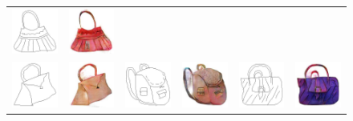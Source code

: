 \begin{figure}
\begin{center}
\begin{tabular}{cccccc}
\includegraphics[width=0.167\linewidth]{figs/handbags_sketches_lotsofresults_latex/input_13248.jpg} &
\includegraphics[width=0.167\linewidth]{figs/handbags_sketches_lotsofresults_latex/L1cGAN_13248.jpg} \\
\includegraphics[width=0.167\linewidth]{figs/handbags_sketches_lotsofresults_latex/input_13256.jpg} &
\includegraphics[width=0.167\linewidth]{figs/handbags_sketches_lotsofresults_latex/L1cGAN_13256.jpg} \hspace{0.025in} &

\includegraphics[width=0.167\linewidth]{figs/handbags_sketches_lotsofresults_latex/input_798.jpg} &
\includegraphics[width=0.167\linewidth]{figs/handbags_sketches_lotsofresults_latex/L1cGAN_798.jpg} \hspace{0.025in} &
\includegraphics[width=0.167\linewidth]{figs/handbags_sketches_lotsofresults_latex/input_13258.jpg} &
\includegraphics[width=0.167\linewidth]{figs/handbags_sketches_lotsofresults_latex/L1cGAN_13258.jpg} \\


\end{tabular}
\end{center}
\end{figure}
